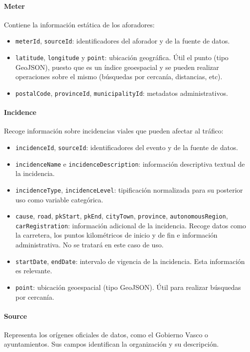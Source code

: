 \paragraph*{Meter}
Contiene la información estática de los aforadores:
\begin{itemize}
	\item \texttt{meterId}, \texttt{sourceId}: identificadores del aforador y de la fuente de datos.
	\item \texttt{latitude}, \texttt{longitude} y \texttt{point}: ubicación geográfica. Útil el punto (tipo GeoJSON), puesto que es un índice geoespacial y se pueden realizar operaciones sobre el mismo (búsquedas por cercanía, distancias, etc).
	\item \texttt{postalCode}, \texttt{provinceId}, \texttt{municipalityId}: metadatos administrativos.
\end{itemize}

\paragraph*{Incidence}
Recoge información sobre incidencias viales que pueden afectar al tráfico:
\begin{itemize}
	\item \texttt{incidenceId}, \texttt{sourceId}: identificadores del evento y de la fuente de datos.
	\item \texttt{incidenceName} e \texttt{incidenceDescription}: información descriptiva textual de la incidencia.
	\item \texttt{incidenceType}, \texttt{incidenceLevel}: tipificación normalizada para su posterior uso como variable categórica.
	\item \texttt{cause}, \texttt{road}, \texttt{pkStart}, \texttt{pkEnd}, \texttt{cityTown}, \texttt{province}, \texttt{autonomousRegion}, \texttt{carRegistration}: información adicional de la incidencia. Recoge datos como la carretera, los puntos kilométricos de inicio y de fin e información administrativa. No se tratará en este caso de uso.
	\item \texttt{startDate}, \texttt{endDate}: intervalo de vigencia de la incidencia. Esta información es relevante.
	\item \texttt{point}: ubicación geoespacial (tipo GeoJSON). Útil para realizar búsquedas por cercanía.
\end{itemize}

\paragraph*{Source}
Representa los orígenes oficiales de datos, como el Gobierno Vasco o ayuntamientos. Sus campos identifican la organización y su descripción.

